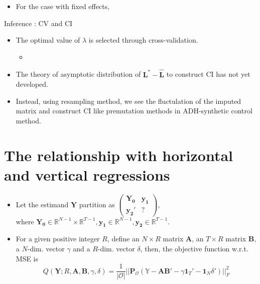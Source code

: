 \documentclass[xcolor=svgnames,aspectratio=169]{beamer}
\newcommand{\R}{\mathbb{R}}
\begin{document}
\begin{frame}
    \begin{itemize}
        \item For the case with fixed effects,  
    \end{itemize}
\end{frame}

\begin{frame}{Inference : CV and CI}
    \begin{itemize}
        \item The optimal value of $\lambda$ is selected through \alert{cross-validation}.
        \begin{itemize}
            \item 
        \end{itemize}
        \item The theory of asymptotic distribution of $\mathbf{L^*}-\mathbf{\hat{L}}$ to construct CI has not yet developed.
        \item Instead, using resampling method, we see the fluctulation of the imputed matrix and construct CI like premutation methods in ADH-synthetic control method.
    \end{itemize}
\end{frame}

\section{The relationship with horizontal and vertical regressions}

\begin{frame}
    \begin{itemize}
        \item Let the estimand $\mathbf{Y}$ partition as $
        \begin{pmatrix} \mathbf{Y_0} & \mathbf{y_1} \\ \mathbf{y_2}' & ? \end{pmatrix}$, \\ where $\mathbf{Y_0}\in\R^{N-1}\times \R^{T-1}, \mathbf{y_1}\in\R^{N-1}, \mathbf{y_2}\in\R^{T-1}$.
        \item For a given positive integer $R$, define an $N\times R$ matrix $\mathbf{A}$, an $T\times R$ matrix $\mathbf{B}$, a $N$-dim. vector $\gamma$ and a $R$-dim. vector $\delta$, then, the objective function w.r.t. MSE is
        \[
        Q(\mathbf{Y}; R, \mathbf{A}, \mathbf{B}, \gamma, \delta)=\frac{1}{|\mathcal{O} |} ||\mathbf{P_{\mathcal{O} }}({\mathbb{Y}-\mathbf{AB'}-\gamma}\mathbf{1}_T'-\mathbf{1}_N\delta')||_F^2
        \]
    \end{itemize}
\end{frame}
\end{document}
